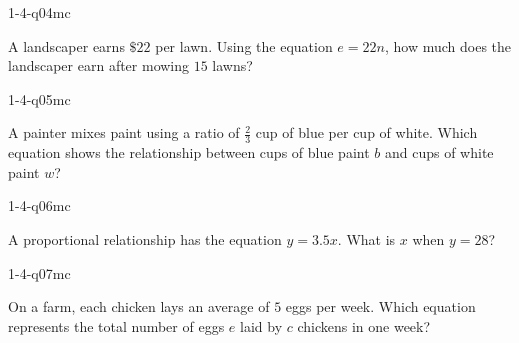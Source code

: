 \begin{practiceQuestion}{1-4-q04}{mc}
\begin{questionText}
A landscaper earns $\$22$ per lawn. Using the equation $e = 22n$, how much does the landscaper earn after mowing $15$ lawns?
\end{questionText}
\end{practiceQuestion}

\begin{practiceQuestion}{1-4-q05}{mc}
\begin{questionText}
A painter mixes paint using a ratio of $\frac{2}{3}$ cup of blue per cup of white. Which equation shows the relationship between cups of blue paint $b$ and cups of white paint $w$?
\end{questionText}
\end{practiceQuestion}

\begin{practiceQuestion}{1-4-q06}{mc}
\begin{questionText}
A proportional relationship has the equation $y = 3.5x$. What is $x$ when $y = 28$?
\end{questionText}
\end{practiceQuestion}

\begin{practiceQuestion}{1-4-q07}{mc}
\begin{questionText}
On a farm, each chicken lays an average of $5$ eggs per week. Which equation represents the total number of eggs $e$ laid by $c$ chickens in one week?
\end{questionText}
\end{practiceQuestion}

